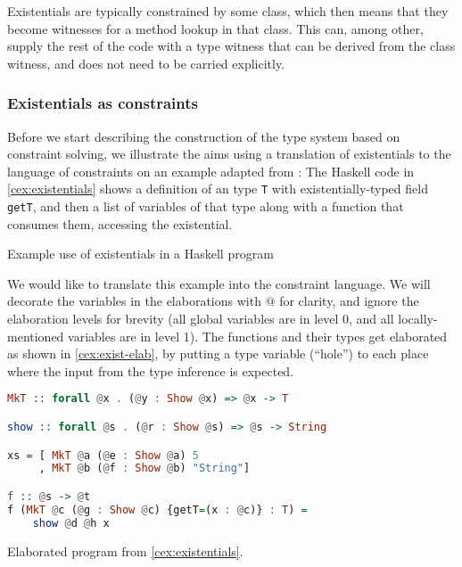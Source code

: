 Existentials are typically constrained by some class, which then means that they become witnesses for a method lookup in that class. This can, among other, supply the rest of the code with a type witness that can be derived from the class witness, and does not need to be carried explicitly.

\subsubsection{Existentials as constraints}

Before we start describing the construction of the type system based on constraint solving, we illustrate the aims using a translation of existentials to the language of constraints on an example adapted from \cite{peytonjones2019type}:
The Haskell code in \cref{cex:existentials} shows a definition of an type \lstinline{T} with existentially-typed field \lstinline{getT}, and then a list of variables of that type along with a function that consumes them, accessing the existential.

\begin{codex}

\caption{Example use of existentials in a Haskell program}
\label{cex:existentials}
\end{codex}

We would like to translate this example into the constraint language. We will decorate the variables in the elaborations with $@$ for clarity, and ignore the elaboration levels for brevity (all global variables are in level 0, and all locally-mentioned variables are in level 1). The functions and their types get elaborated as shown in \cref{cex:exist-elab}, by putting a type variable (``hole'') to each place where the input from the type inference is expected.

\begin{codex}
\begin{lstlisting}[language=Haskell]
MkT :: forall @x . (@y : Show @x) => @x -> T

show :: forall @s . (@r : Show @s) => @s -> String

xs = [ MkT @a (@e : Show @a) 5
     , MkT @b (@f : Show @b) "String"]

f :: @s -> @t
f (MkT @c (@g : Show @c) {getT=(x : @c)} : T) =
    show @d @h x
\end{lstlisting}
\caption{Elaborated program from \cref{cex:existentials}.}
\label{cex:exist-elab}
\end{codex}

